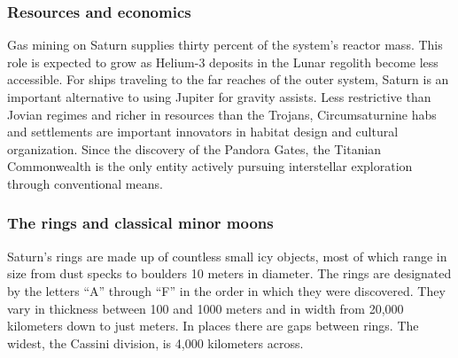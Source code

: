 \subsubsection{Resources and economics}
\label{sec:resources-economics-1}

Gas mining on Saturn supplies thirty percent of the system's reactor
mass. This role is expected to grow as Helium-3 deposits in the Lunar
regolith become less accessible. For ships traveling to the far
reaches of the outer system, Saturn is an important alternative to
using Jupiter for gravity assists. Less restrictive than Jovian
regimes and richer in resources than the Trojans, Circumsaturnine habs
and settlements are important innovators in habitat design and
cultural organization. Since the discovery of the Pandora Gates, the
Titanian Commonwealth is the only entity actively pursuing
interstellar exploration through conventional means.

\subsubsection{The rings and classical minor moons}
\label{sec:rings-class-minor}

Saturn's rings are made up of countless small icy objects, most of
which range in size from dust specks to boulders 10 meters in
diameter. The rings are designated by the letters “A” through “F” in
the order in which they were discovered. They vary in thickness
between 100 and 1000 meters and in width from 20,000 kilometers down
to just meters. In places there are gaps between rings. The widest,
the Cassini division, is 4,000 kilometers across.



